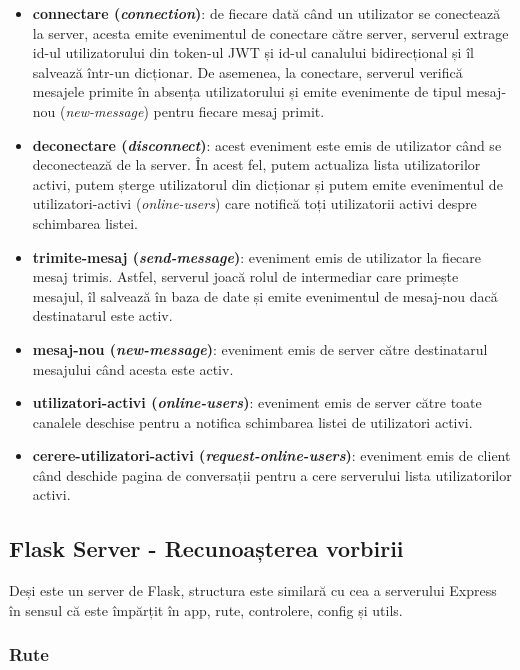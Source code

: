 \begin{itemize}
    \item \textbf{connectare (\textit{connection})}: de fiecare dată când un utilizator se conectează la server, acesta emite
    evenimentul de conectare către server, serverul extrage id-ul utilizatorului din token-ul JWT și id-ul canalului bidirecțional
    și îl salvează într-un dicționar. De asemenea, la conectare, serverul verifică mesajele primite în absența utilizatorului 
    și emite evenimente de tipul mesaj-nou (\textit{new-message}) pentru fiecare mesaj primit.
    \item \textbf{deconectare (\textit{disconnect})}: acest eveniment este emis de utilizator când se deconectează de la server. 
    În acest fel, putem actualiza lista utilizatorilor activi, putem șterge utilizatorul din dicționar și putem emite evenimentul
    de utilizatori-activi (\textit{online-users}) care notifică toți utilizatorii activi despre schimbarea listei.
    \item \textbf{trimite-mesaj (\textit{send-message})}: eveniment emis de utilizator la fiecare mesaj trimis. Astfel, serverul
    joacă rolul de intermediar care primește mesajul, îl salvează în baza de date și emite evenimentul de mesaj-nou dacă
    destinatarul este activ.
    \item \textbf{mesaj-nou (\textit{new-message})}: eveniment emis de server către destinatarul mesajului când acesta este activ.
    \item \textbf{utilizatori-activi (\textit{online-users})}: eveniment emis de server către toate canalele deschise pentru a
    notifica schimbarea listei de utilizatori activi.
    \item \textbf{cerere-utilizatori-activi (\textit{request-online-users})}: eveniment emis de client când deschide pagina de
    conversații pentru a cere serverului lista utilizatorilor activi.
\end{itemize}

\subsection{Flask Server - Recunoașterea vorbirii}
Deși este un server de Flask, structura este similară cu cea a serverului Express în sensul
că este împărțit în app, rute, controlere, config și utils.

\subsubsection{Rute}

